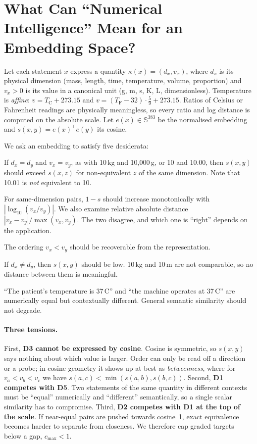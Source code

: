 \documentclass[11pt]{article}
\begin{document}
\section{What Can ``Numerical Intelligence'' Mean for an Embedding Space?}
\label{sec:formulation}
Let each statement $x$ express a quantity $\kappa(x) = (d_x, v_x)$, where $d_x$ is its physical dimension (mass, length,
time, temperature, volume, proportion) and $v_x>0$ is its value in a canonical unit (g, m, s, K, L, dimensionless).
Temperature is \emph{affine}: $v = T_{\mathrm C} + 273.15$ and $v = (T_{\mathrm F}-32)\cdot\tfrac59 + 273.15$. Ratios of
Celsius or Fahrenheit readings are physically meaningless, so every ratio and log distance is computed on the
absolute scale. Let $e(x)\in\mathbb{S}^{383}$ be the normalised embedding and $s(x,y)=e(x)^\top e(y)$ its cosine.

We ask an embedding to satisfy five desiderata:
\begin{description}[leftmargin=*,itemsep=2pt]
\item[D1 Equivalence.] If $d_x=d_y$ and $v_x=v_y$, as with 10\,kg and 10{,}000\,g, or 10 and 10.00, then $s(x,y)$ should
exceed $s(x,z)$ for non-equivalent $z$ of the same dimension. Note that 10.01 is \emph{not} equivalent to 10.
\item[D2 Graded distance.] For same-dimension pairs, $1-s$ should increase monotonically with $|\log_{10}(v_x/v_y)|$. We
also examine relative absolute distance $|v_x-v_y|/\max(v_x,v_y)$. The two disagree, and which one is ``right'' depends
on the application.
\item[D3 Order.] The ordering $v_x<v_y$ should be recoverable from the representation.
\item[D4 Dimensional separation.] If $d_x\neq d_y$, then $s(x,y)$ should be low. 10\,kg and 10\,m are not comparable, so no
distance between them is meaningful.
\item[D5 Context and semantic preservation.] ``The patient's temperature is 37\,\textdegree C'' and ``the machine operates
at 37\,\textdegree C'' are numerically equal but contextually different. General semantic similarity should not
degrade.
\end{description}

\paragraph{Three tensions.} First, \textbf{D3 cannot be expressed by cosine}. Cosine is symmetric, so $s(x,y)$ says
nothing about which value is larger. Order can only be read off a direction or a probe; in cosine geometry it shows
up at best as \emph{betweenness}, where for $v_a<v_b<v_c$ we have $s(a,c)<\min(s(a,b),s(b,c))$. Second, \textbf{D1
competes with D5}. Two statements of the same quantity in different contexts must be ``equal'' numerically and
``different'' semantically, so a single scalar similarity has to compromise. Third, \textbf{D2 competes with D1 at
the top of the scale}. If near-equal pairs are pushed towards cosine~1, exact equivalence becomes harder to separate
from closeness. We therefore cap graded targets below a gap, $c_{\max}<1$.
\end{document}
